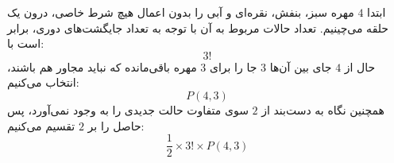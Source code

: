 \p
ابتدا 
$4$
مهره سبز، بنفش، نقره‌ای و آبی را بدون اعمال هیچ شرط خاصی، درون یک حلقه می‌چینیم. تعداد حالات مربوط به آن با توجه به تعداد جایگشت‌ها‌ی دوری، برابر است با:
$$3!$$
حال از
$4$
  جای بین آن‌ها 
$3$
   جا را برای 
$3$
    مهره باقی‌مانده که نباید مجاور هم باشند، انتخاب می‌کنیم:
     $$P(4,3)$$
      همچنین نگاه به دست‌بند از
$2$
    سوی متفاوت حالت جدیدی را به وجود نمی‌آورد، پس حاصل را بر 
$2$
    تقسیم می‌کنیم:
    $$\frac 1 2 \times3!\times P(4,3)$$